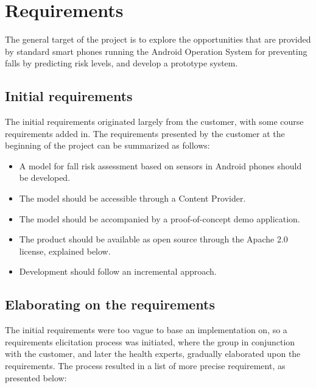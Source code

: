 \chapter{Requirements}

The general target of the project is to explore the opportunities that are provided by standard smart phones running the Android Operation System for preventing falls by predicting risk levels, and develop a prototype system. 

\section{Initial requirements}
The initial requirements originated largely from the customer, with some course requirements added in. The requirements presented by the customer at the beginning of the project can be summarized as follows:

\begin{itemize}
\item A model for fall risk assessment based on sensors in Android phones should be developed.
\item The model should be accessible through a Content Provider.
\item The model should be accompanied by a proof-of-concept demo application.
\item The product should be available as open source through the Apache 2.0 license, explained below.
\item Development should follow an incremental approach.
\end{itemize}

\section{Elaborating on the requirements}
The initial requirements were too vague to base an implementation on, so a requirements elicitation process was initiated, where the group in conjunction with the customer, and later the health experts, gradually elaborated upon the requirements. The process resulted in a list of more precise requirement, as presented below:

